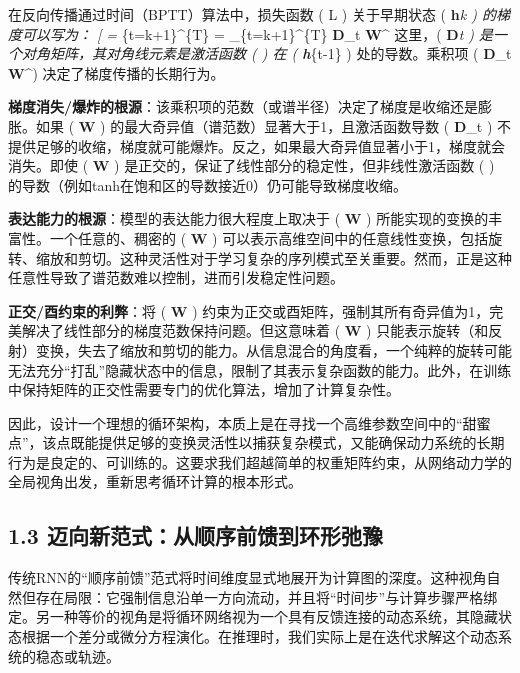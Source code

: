 \documentclass[
  12pt,
]{article}
\begin{document}
在反向传播通过时间（BPTT）算法中，损失函数 ( L ) 关于早期状态 (
\textbf{h}\emph{k ) 的梯度可以写为： {[}
 =
 \prod}\{t=k+1\}\^{}\{T\}
 =
 \prod\_\{t=k+1\}\^{}\{T\}
\textbf{D}\_t \textbf{W}\^{}\top {]} 这里，( \textbf{D}\emph{t )
是一个对角矩阵，其对角线元素是激活函数 ( \sigma ) 在 (
\textbf{h}}\{t-1\} ) 处的导数。乘积项 ( \prod \textbf{D}\_t
\textbf{W}\^{}\top ) 决定了梯度传播的长期行为。

\textbf{梯度消失/爆炸的根源}：该乘积项的范数（或谱半径）决定了梯度是收缩还是膨胀。如果
( \textbf{W} ) 的最大奇异值（谱范数）显著大于1，且激活函数导数 (
\textbf{D}\_t )
不提供足够的收缩，梯度就可能爆炸。反之，如果最大奇异值显著小于1，梯度就会消失。即使
( \textbf{W} ) 是正交的，保证了线性部分的稳定性，但非线性激活函数 (
\sigma ) 的导数（例如tanh在饱和区的导数接近0）仍可能导致梯度收缩。

\textbf{表达能力的根源}：模型的表达能力很大程度上取决于 ( \textbf{W} )
所能实现的变换的丰富性。一个任意的、稠密的 ( \textbf{W} )
可以表示高维空间中的任意线性变换，包括旋转、缩放和剪切。这种灵活性对于学习复杂的序列模式至关重要。然而，正是这种任意性导致了谱范数难以控制，进而引发稳定性问题。

\textbf{正交/酉约束的利弊}：将 ( \textbf{W} )
约束为正交或酉矩阵，强制其所有奇异值为1，完美解决了线性部分的梯度范数保持问题。但这意味着
( \textbf{W} )
只能表示旋转（和反射）变换，失去了缩放和剪切的能力。从信息混合的角度看，一个纯粹的旋转可能无法充分``打乱''隐藏状态中的信息，限制了其表示复杂函数的能力。此外，在训练中保持矩阵的正交性需要专门的优化算法，增加了计算复杂性。

因此，设计一个理想的循环架构，本质上是在寻找一个高维参数空间中的``甜蜜点''，该点既能提供足够的变换灵活性以捕获复杂模式，又能确保动力系统的长期行为是良定的、可训练的。这要求我们超越简单的权重矩阵约束，从网络动力学的全局视角出发，重新思考循环计算的根本形式。

\hypertarget{ux8fc8ux5411ux65b0ux8303ux5f0fux4eceux987aux5e8fux524dux9988ux5230ux73afux5f62ux5f1bux8c6b}{%
\subsection{1.3
迈向新范式：从顺序前馈到环形弛豫}\label{ux8fc8ux5411ux65b0ux8303ux5f0fux4eceux987aux5e8fux524dux9988ux5230ux73afux5f62ux5f1bux8c6b}}

传统RNN的``顺序前馈''范式将时间维度显式地展开为计算图的深度。这种视角自然但存在局限：它强制信息沿单一方向流动，并且将``时间步''与计算步骤严格绑定。另一种等价的视角是将循环网络视为一个具有反馈连接的动态系统，其隐藏状态根据一个差分或微分方程演化。在推理时，我们实际上是在迭代求解这个动态系统的稳态或轨迹。
\end{document}
